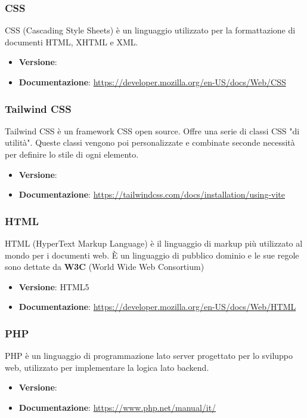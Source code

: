 \documentclass[a4paper,10pt]{article}
\begin{document}
\subsubsection{CSS}
CSS (Cascading Style Sheets) è un linguaggio utilizzato per la formattazione di documenti HTML, XHTML e XML.
\begin{itemize}
    \item \textbf{Versione}:
    \item \textbf{Documentazione}: \url{https://developer.mozilla.org/en-US/docs/Web/CSS}
\end{itemize}

\subsubsection{Tailwind CSS}
Tailwind CSS è un framework CSS open source. Offre una serie  di classi CSS "di utilità". Queste classi vengono poi personalizzate e combinate seconde necessità per definire lo stile di ogni elemento.
\begin{itemize}
    \item \textbf{Versione}:
    \item \textbf{Documentazione}: \url{https://tailwindcss.com/docs/installation/using-vite}
\end{itemize}

\subsubsection{HTML}
HTML (HyperText Markup Language) è il linguaggio di markup più utilizzato al mondo per i documenti web. È un linguaggio di pubblico dominio e le sue regole sono dettate da \textbf{W3C} (World Wide Web Consortium)
\begin{itemize}
    \item \textbf{Versione}: HTML5
    \item \textbf{Documentazione}: \url{https://developer.mozilla.org/en-US/docs/Web/HTML}
\end{itemize}

\subsubsection{PHP}
PHP è un linguaggio di programmazione lato server progettato per lo sviluppo web, utilizzato per implementare la logica lato backend.
\begin{itemize}
    \item \textbf{Versione}:
    \item \textbf{Documentazione}: \url{https://www.php.net/manual/it/}
\end{itemize}
\end{document}
